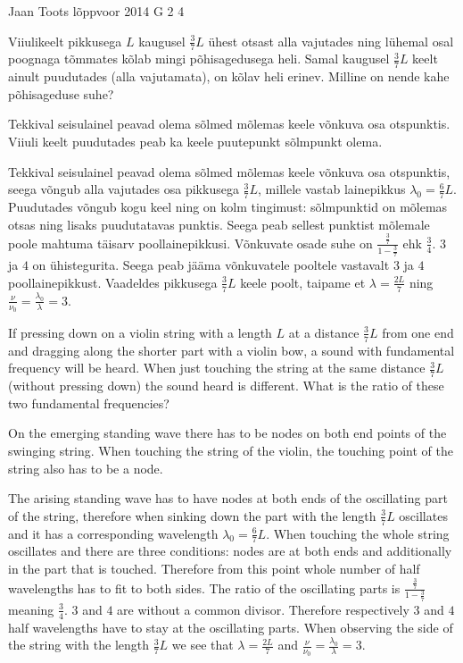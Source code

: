 {Jaan Toots} %
{lõppvoor} %
{2014} %
{G 2} %
{4} %
{
\ifStatement
Viiulikeelt pikkusega $L$ kaugusel $\frac{3}{7}L$ ühest otsast alla vajutades ning lühemal osal poognaga tõmmates kõlab mingi põhisagedusega heli. Samal kaugusel $\frac{3}{7}L$ keelt ainult puudutades (alla vajutamata), on kõlav heli erinev. Milline on nende kahe põhisageduse suhe?
\fi


\ifHint
Tekkival seisulainel peavad olema sõlmed mõlemas keele võnkuva osa otspunktis. Viiuli keelt puudutades peab ka keele puutepunkt sõlmpunkt olema.
\fi


\ifSolution
Tekkival seisulainel peavad olema sõlmed mõlemas keele võnkuva osa otspunktis, seega võngub alla vajutades osa pikkusega $\frac{3}{7}L$, millele vastab lainepikkus $\lambda_0=\frac{6}{7}L$. Puudutades võngub kogu keel ning on kolm tingimust: sõlmpunktid on mõlemas otsas ning lisaks puudutatavas punktis. Seega peab sellest punktist mõlemale poole mahtuma täisarv poollainepikkusi. Võnkuvate osade suhe on $\frac{\frac{3}{7}}{1-\frac{3}{7}}$ ehk $\frac{3}{4}$. $3$ ja $4$ on ühistegurita. Seega peab jääma võnkuvatele pooltele vastavalt $3$ ja $4$ poollainepikkust. Vaadeldes pikkusega $\frac{3}{7}L$ keele poolt, taipame et $\lambda=\frac{2L}{7}$ ning $\frac{\nu}{\nu_0}=\frac{\lambda_0}{\lambda}=3$.
\fi


\ifEngStatement
If pressing down on a violin string with a length $L$ at a distance $\frac{3}{7}L$ from one end and dragging along the shorter part with a violin bow, a sound with fundamental frequency will be heard. When just touching the string at the same distance $\frac{3}{7}L$ (without pressing down) the sound heard is different. What is the ratio of these two fundamental frequencies?
\fi


\ifEngHint
On the emerging standing wave there has to be nodes on both end points of the swinging string. When touching the string of the violin, the touching point of the string also has to be a node.
\fi


\ifEngSolution
The arising standing wave has to have nodes at both ends of the oscillating part of the string, therefore when sinking down the part with the length $\frac{3}{7}L$ oscillates and it has a corresponding wavelength $\lambda_0=\frac{6}{7}L$. When touching the whole string oscillates and there are three conditions: nodes are at both ends and additionally in the part that is touched. Therefore from this point whole number of half wavelengths has to fit to both sides. The ratio of the oscillating parts is $\frac{\frac{3}{7}}{1-\frac{3}{7}}$ meaning $\frac{3}{4}$. $3$ and $4$ are without a common divisor. Therefore respectively $3$ and $4$ half wavelengths have to stay at the oscillating parts. When observing the side of the string with the length $\frac{3}{7}L$ we see that $\lambda=\frac{2L}{7}$ and $\frac{\nu}{\nu_0}=\frac{\lambda_0}{\lambda}=3$.
\fi
}